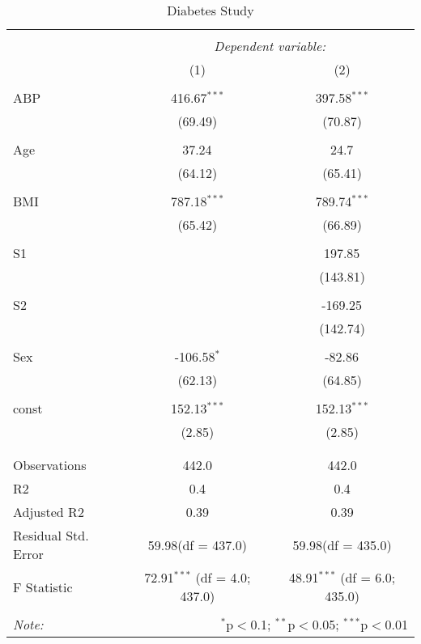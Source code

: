 \documentclass[12pt]{article}
\numberwithin{equation}{subsection}
\begin{document}
\begin{table}[!htbp] \centering
  \caption{Diabetes Study}
  \label{}
\begin{tabular}{@{\extracolsep{5pt}}lcc}
\\[-1.8ex]\hline
\hline \\[-1.8ex]
& \multicolumn{2}{c}{\textit{Dependent variable:}} \
\cr \cline{2-3}
\\[-1.8ex] & (1) & (2) \\
\hline \\[-1.8ex]
 ABP & 416.67$^{***}$ & 397.58$^{***}$ \\
  & (69.49) & (70.87) \\
  & & \\
 Age & 37.24$^{}$ & 24.7$^{}$ \\
  & (64.12) & (65.41) \\
  & & \\
 BMI & 787.18$^{***}$ & 789.74$^{***}$ \\
  & (65.42) & (66.89) \\
  & & \\
 S1 & & 197.85$^{}$ \\
  & & (143.81) \\
  & & \\
 S2 & & -169.25$^{}$ \\
  & & (142.74) \\
  & & \\
 Sex & -106.58$^{*}$ & -82.86$^{}$ \\
  & (62.13) & (64.85) \\
  & & \\
 const & 152.13$^{***}$ & 152.13$^{***}$ \\
  & (2.85) & (2.85) \\
  & & \\
\hline \\[-1.8ex]
 Observations & 442.0 & 442.0 \\
 R${2}$ & 0.4 & 0.4 \\
 Adjusted R${2}$ & 0.39 & 0.39 \\
 Residual Std. Error & 59.98(df = 437.0) & 59.98(df = 435.0)  \\
 F Statistic & 72.91$^{***}$ (df = 4.0; 437.0) & 48.91$^{***}$ (df = 6.0; 435.0) \\
\hline
\hline \\[-1.8ex]
\textit{Note:} & \multicolumn{2}{r}{$^{*}$p$<$0.1; $^{**}$p$<$0.05; $^{***}$p$<$0.01} \\
\end{tabular}
\end{table}
\end{document}
